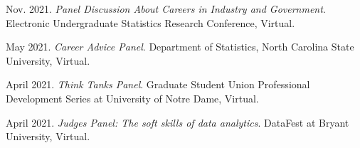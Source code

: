 \begin{etaremune}[topsep=0pt, itemsep=4pt, partopsep=0pt, parsep=0pt]
    \item Nov. 2021. \textit{Panel Discussion About Careers in Industry and Government}. Electronic Undergraduate Statistics Research Conference, Virtual.

    \item May 2021. \textit{Career Advice Panel}. Department of Statistics, North Carolina State University, Virtual.
    
    \item April 2021. \textit{Think Tanks Panel}. Graduate Student Union Professional Development Series at University of Notre Dame, Virtual.
    
    \item April 2021. \textit{Judges Panel: The soft skills of data analytics}. DataFest at Bryant University, Virtual.
\end{etaremune}
